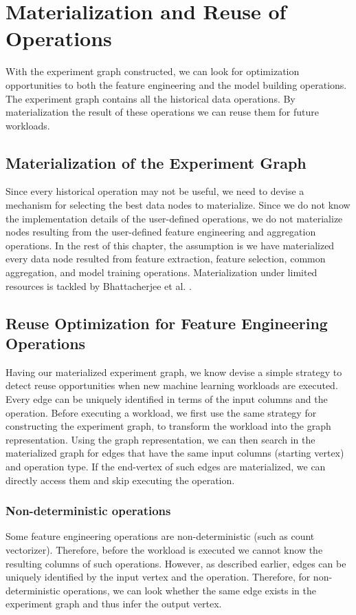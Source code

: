 \section{Materialization and Reuse of Operations}\label{sec-materializaiton-and-reuse}
With the experiment graph constructed, we can look for optimization opportunities to both the feature engineering and the model building operations.
The experiment graph contains all the historical data operations.
By materialization the result of these operations we can reuse them for future workloads.

\subsection{Materialization of the Experiment Graph}
Since every historical operation may not be useful, we need to devise a mechanism for selecting the best data nodes to materialize.
Since we do not know the implementation details of the user-defined operations, we do not materialize nodes resulting from the user-defined feature engineering and aggregation operations.
In the rest of this chapter, the assumption is we have materialized every data node resulted from feature extraction, feature selection, common aggregation, and model training operations.
Materialization under limited resources is tackled by Bhattacherjee et al. \cite{bhattacherjee2015principles}.

\subsection{Reuse Optimization for Feature Engineering Operations}
Having our materialized experiment graph, we know devise a simple strategy to detect reuse opportunities when new machine learning workloads are executed.
Every edge can be uniquely identified in terms of the input columns and the operation.
Before executing a workload, we first use the same strategy for constructing the experiment graph, to transform the workload into the graph representation.
Using the graph representation, we can then search in the materialized graph for edges that have the same input columns (starting vertex) and operation type.
If the end-vertex of such edges are materialized, we can directly access them and skip executing the operation.

\subsubsection{Non-deterministic operations}
Some feature engineering operations are non-deterministic (such as count vectorizer).
Therefore, before the workload is executed we cannot know the resulting columns of such operations.
However, as described earlier, edges can be uniquely identified by the input vertex and the operation.
Therefore, for non-deterministic operations, we can look whether the same edge exists in the experiment graph and thus infer the output vertex.

